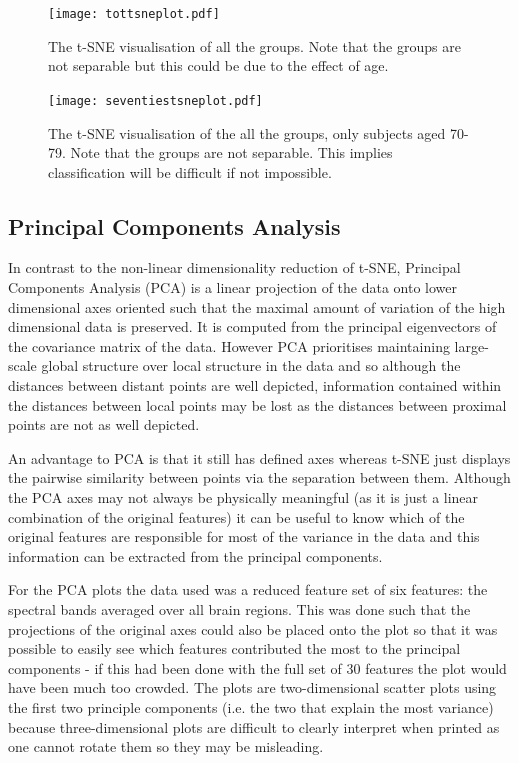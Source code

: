 \begin{figure}[h!]
  \centering
    \texttt{[image: tottsneplot.pdf]}
    \caption{The t-SNE visualisation of all the groups. Note that the groups are not separable but this could be due to the effect of age.}
    \label{fig:tottsneplot}
\end{figure}


\begin{figure}[h!]
  \centering
    \texttt{[image: seventiestsneplot.pdf]}
    \caption{The t-SNE visualisation of the all the groups, only subjects aged 70-79. Note that the groups are not separable. This implies classification will be difficult if not impossible.}
    \label{fig:seventiestsneplot}
\end{figure}

\clearpage


\subsection{Principal Components Analysis}

In contrast to the non-linear dimensionality reduction of t-SNE, Principal Components Analysis (PCA) is a linear projection of the data onto lower dimensional axes oriented such that the maximal amount of variation of the high dimensional data is preserved. \cite{Bushati2011} It is computed from the principal eigenvectors of the covariance matrix of the data. However PCA prioritises maintaining large-scale global structure over local structure in the data and so although the distances between distant points are well depicted, information contained within the distances between local points may be lost as the distances between proximal points are not as well depicted.

An advantage to PCA is that it still has defined axes whereas t-SNE just displays the pairwise similarity between points via the separation between them. Although the PCA axes may not always be physically meaningful (as it is just a linear combination of the original features) it can be useful to know which of the original features are responsible for most of the variance in the data and this information can be extracted from the principal components.

For the PCA plots the data used was a reduced feature set of six features: the spectral bands averaged over all brain regions. This was done such that the projections of the original axes could also be placed onto the plot so that it was possible to easily see which features contributed the most to the principal components - if this had been done with the full set of 30 features the plot would have been much too crowded. The plots are two-dimensional scatter plots using the first two principle components (i.e. the two that explain the most variance) because three-dimensional plots are difficult to clearly interpret when printed as one cannot rotate them so they may be misleading.

